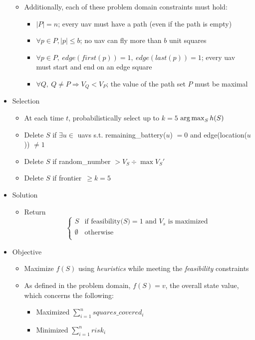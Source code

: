 \documentclass[../main.tex]{subfiles}
\begin{document}
\begin{itemize}
\begin{itemize}
        \item Additionally, each of these problem domain constraints must hold:
        \begin{itemize}
            \item $|P|=n$; every \ac{uav} must have a path (even if the path is empty)
            \item $\forall p\in P, |p|\leq b$; no \ac{uav} can fly more than $b$ unit squares
            \item $\forall p\in P, \ edge(first(p)) = 1, \ edge(last(p)) = 1$; every \ac{uav} must start and end on an edge square
            \item $\forall Q, \ Q\neq P \Rightarrow V_Q<V_P$; the value of the path set $P$ must be maximal
        \end{itemize}
    \end{itemize}

    \item Selection
    \begin{itemize}
        \item At each time $t$, probabilistically select up to $k=5$ $\operatorname*{arg\,max}_S h(S)$
        \item Delete $S$ if $\exists u\in$ \acp{uav} s.t. remaining\_battery($u$) $=0$ and edge(location($u$)) $\neq 1$
        \item Delete $S$ if random\_number $>V_S\div\max V_S'$
        \item Delete $S$ if \textbar frontier\textbar\ $\geq k=5$
    \end{itemize}

    \item Solution
    \begin{itemize}
        \item Return \[
            \begin{cases}
                S & \text{if feasibility(}S\text{)}=1 \text{ and }V_s\text{ is maximized} \\
                \emptyset & \text{otherwise} \\
            \end{cases}
        \]
    \end{itemize}

    \item Objective
    \begin{itemize}
        \item Maximize $f(S)$ using \textit{heuristics} while meeting the \textit{feasibility} constraints
        \item As defined in the problem domain, $f(S)=v$, the overall state value, which concerns the following: 
        \begin{itemize}
            \item Maximized $\sum_{i=1}^{n}{squares\_covered_i}$
            \item Minimized $\sum_{i=1}^{n}{risk_i}$
        \end{itemize}
    \end{itemize}


\end{itemize}
\end{document}
